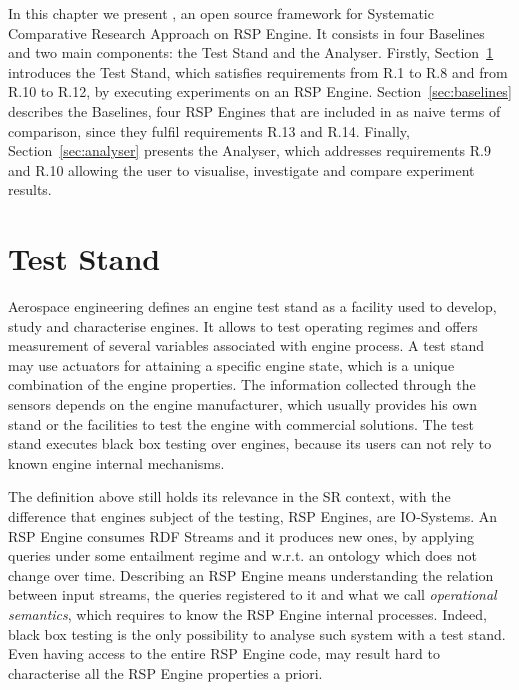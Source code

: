 In this chapter  we present \namens,  an open source framework for Systematic Comparative Research Approach on RSP Engine.
It consists in four Baselines and two main components: the Test Stand and the Analyser. Firstly, Section~\ref{sec:teststand} introduces the Test Stand, which satisfies requirements from R.1 to R.8 and from R.10 to R.12, by executing experiments on an RSP Engine. Section~\ref{sec:baselines} describes the Baselines, four RSP Engines that are included in \name as naive terms of comparison, since they fulfil requirements R.13 and R.14. Finally, Section~\ref{sec:analyser} presents the Analyser, which addresses requirements R.9 and R.10  allowing the user to visualise, investigate and compare experiment results. %

\section{Test Stand}\label{sec:teststand}

Aerospace engineering defines an engine test stand as a facility used to develop, study and characterise engines. It allows to test operating regimes and offers measurement of several variables associated with engine process. A test stand may use actuators for attaining a specific engine state, which is a unique combination of the engine properties. The information collected through the sensors depends on the engine manufacturer, which usually provides his own stand or the facilities to test the engine with commercial solutions. The test stand executes black box testing over engines, because its users can not rely to known engine internal mechanisms.

The definition above still holds its relevance in the SR context, with the difference that engines subject of the testing, RSP Engines, are IO-Systems. An RSP Engine consumes  RDF Streams and it produces new ones, by applying queries under some entailment regime and w.r.t. an ontology which does not change over time. Describing an RSP Engine means understanding the relation between input streams, the queries registered to it and what we call \textit{operational semantics}, which requires to know the RSP Engine internal processes. Indeed, black box testing is the only possibility to analyse such system with a test stand. Even having access to the entire RSP Engine code, may result hard to characterise all the RSP Engine properties a priori. 

